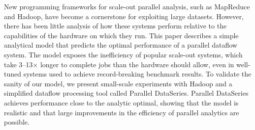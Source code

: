 New programming frameworks for scale-out parallel analysis, such
as MapReduce and Hadoop, have become a cornerstone for exploiting
large datasets.  However, there has been little analysis of how these
systems perform relative to the capabilities of the hardware on which they run.
This paper describes a simple analytical model that predicts the
optimal performance of a parallel dataflow system.
The model exposes the inefficiency of popular scale-out systems,
which take 3--13$\times$ longer to complete jobs than the hardware
should allow, even in well-tuned systems used to achieve record-breaking
benchmark results.
To validate the sanity of our model, we present small-scale
experiments with Hadoop and a simplified dataflow processing tool
called Parallel DataSeries.
Parallel DataSeries achieves performance close to the analytic
optimal, showing that the model is realistic and that large improvements
in the efficiency of parallel analytics are possible.

